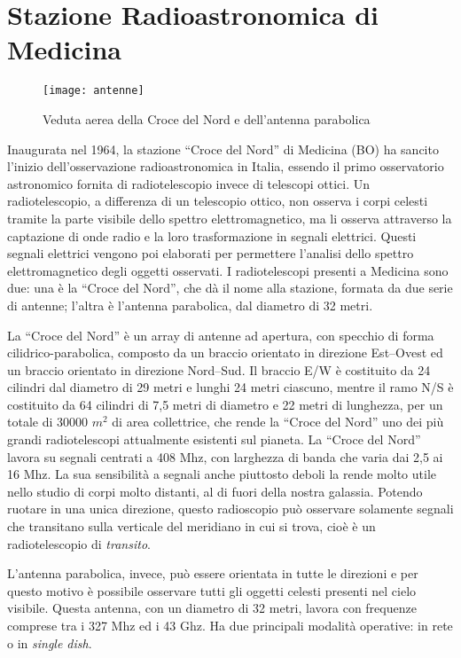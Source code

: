 \section*{Stazione Radioastronomica di Medicina}
\begin{figure}[htb]
	\begin{center}
		\texttt{[image: antenne]}
	\end{center}
	\caption{Veduta aerea della Croce del Nord e dell'antenna parabolica}
	\label{fig:rtscopes}
\end{figure}
Inaugurata nel 1964, la stazione ``Croce del Nord'' di Medicina (BO) ha sancito
l'inizio dell'osservazione radioastronomica in Italia, essendo il primo
osservatorio astronomico fornita di radiotelescopio invece di telescopi ottici.
Un radiotelescopio, a differenza di un telescopio ottico, non osserva i corpi
celesti tramite la parte visibile dello spettro elettromagnetico, ma li osserva
attraverso la captazione di onde radio e la loro trasformazione in segnali
elettrici. Questi segnali elettrici vengono poi elaborati per permettere
l'analisi dello spettro elettromagnetico degli oggetti osservati. I
radiotelescopi presenti a Medicina sono due: una \`e la ``Croce del Nord'', che
d\`a il nome alla stazione, formata da due serie di antenne; l'altra \`e
l'antenna parabolica, dal diametro di 32 metri.

La ``Croce del Nord'' \`e un array di antenne ad apertura, con specchio di forma
cilidrico-parabolica, composto da un braccio orientato in direzione Est--Ovest
ed un braccio orientato in direzione Nord--Sud. Il braccio E/W \`e costituito da
24 cilindri dal diametro di 29 metri e lunghi 24 metri ciascuno, mentre il ramo
N/S \`e costituito da 64 cilindri  di 7,5 metri di diametro e 22 metri di
lunghezza, per un totale di 30000 $m^2$ di area collettrice, che rende la
``Croce del Nord'' uno dei pi\`u grandi radiotelescopi attualmente esistenti sul
pianeta. La ``Croce del Nord'' lavora su segnali centrati a 408 Mhz, con
larghezza di banda che varia dai 2,5 ai 16 Mhz. La sua sensibilit\`a a segnali
anche piuttosto deboli la rende molto utile nello studio di corpi molto
distanti, al di fuori della nostra galassia. Potendo ruotare in una unica
direzione, questo radioscopio pu\`o osservare solamente segnali che transitano
sulla verticale del meridiano in cui si trova, cio\`e \`e un radiotelescopio di
\emph{transito}.

L'antenna parabolica, invece, pu\`o essere orientata in tutte le
direzioni e per questo motivo \`e possibile osservare tutti gli oggetti celesti
presenti nel cielo visibile. Questa antenna, con un diametro di 32 metri, lavora
con frequenze comprese tra i 327 Mhz ed i 43 Ghz. Ha due principali modalit\`a
operative: in rete o in \emph{single dish}.


